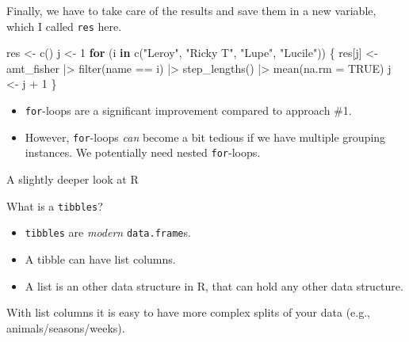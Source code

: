 \documentclass[ignorenonframetext,,t]{beamer}
\let\oldtextbf\textbf
\renewcommand{\textbf}[1]{\textcolor{spamwell}{\oldtextbf{#1}}}
\providecommand{\tightlist}{%
\setlength{\itemsep}{0pt}\setlength{\parskip}{0pt}}
\newenvironment{Shaded}{\begin{snugshade}}{\end{snugshade}}
\newcommand{\AttributeTok}[1]{\textcolor[rgb]{0.77,0.63,0.00}{#1}}
\newcommand{\ConstantTok}[1]{\textcolor[rgb]{0.00,0.00,0.00}{#1}}
\newcommand{\ControlFlowTok}[1]{\textcolor[rgb]{0.13,0.29,0.53}{\textbf{#1}}}
\newcommand{\DecValTok}[1]{\textcolor[rgb]{0.00,0.00,0.81}{#1}}
\newcommand{\FunctionTok}[1]{\textcolor[rgb]{0.00,0.00,0.00}{#1}}
\newcommand{\NormalTok}[1]{#1}
\newcommand{\OtherTok}[1]{\textcolor[rgb]{0.56,0.35,0.01}{#1}}
\newcommand{\SpecialCharTok}[1]{\textcolor[rgb]{0.00,0.00,0.00}{#1}}
\newcommand{\StringTok}[1]{\textcolor[rgb]{0.31,0.60,0.02}{#1}}
\providecommand{\tightlist}{%
\setlength{\itemsep}{0pt}\setlength{\parskip}{0pt}}
\renewcommand{\tightlist}{\setlength{\itemsep}{1.4ex}\setlength{\parskip}{0pt}}
\begin{document}
\begin{frame}[fragile]
Finally, we have to take care of the results and save them in a new
variable, which I called \texttt{res} here.

\begin{Shaded}
\begin{Highlighting}[]
\NormalTok{res }\OtherTok{\textless{}{-}} \FunctionTok{c}\NormalTok{()}
\NormalTok{j }\OtherTok{\textless{}{-}} \DecValTok{1}
\ControlFlowTok{for}\NormalTok{ (i }\ControlFlowTok{in} \FunctionTok{c}\NormalTok{(}\StringTok{"Leroy"}\NormalTok{, }\StringTok{"Ricky T"}\NormalTok{, }\StringTok{"Lupe"}\NormalTok{, }\StringTok{"Lucile"}\NormalTok{)) \{}
\NormalTok{  res[j] }\OtherTok{\textless{}{-}}\NormalTok{ amt\_fisher }\SpecialCharTok{|\textgreater{}} \FunctionTok{filter}\NormalTok{(name }\SpecialCharTok{==}\NormalTok{ i) }\SpecialCharTok{|\textgreater{}} 
    \FunctionTok{step\_lengths}\NormalTok{() }\SpecialCharTok{|\textgreater{}} \FunctionTok{mean}\NormalTok{(}\AttributeTok{na.rm =} \ConstantTok{TRUE}\NormalTok{)}
\NormalTok{  j }\OtherTok{\textless{}{-}}\NormalTok{ j }\SpecialCharTok{+} \DecValTok{1}
\NormalTok{\}}
\end{Highlighting}
\end{Shaded}
\end{frame}

\begin{frame}[fragile]
\begin{itemize}
\tightlist
\item
  \texttt{for}-loops are a significant improvement compared to approach
  \#1.
\item
  However, \texttt{for}-loops \emph{can} become a bit tedious if we have
  multiple grouping instances. We potentially need nested
  \texttt{for}-loops.
\end{itemize}
\end{frame}

\begin{frame}[fragile]{A slightly deeper look at R}
\protect\hypertarget{a-slightly-deeper-look-at-r}{}
\begin{block}{What is a \texttt{tibbles}?}
\protect\hypertarget{what-is-a-tibbles}{}
\begin{itemize}
\tightlist
\item
  \texttt{tibbles} are \emph{modern} \texttt{data.frame}s.
\item
  A tibble can have list columns.
\item
  A list is an other data structure in R, that can hold any other data
  structure.
\end{itemize}

With list columns it is easy to have more complex splits of your data
(e.g., animals/seasons/weeks).
\end{block}
\end{frame}
\end{document}
